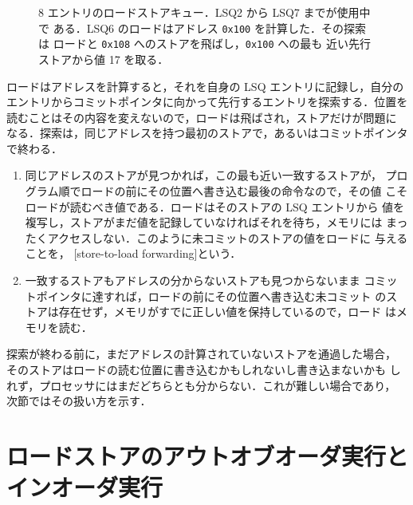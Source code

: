 \documentclass[../main.tex]{subfiles}
\begin{document}
\begin{figure}[htbp]
  \centering
  
  \caption{8 エントリのロードストアキュー．LSQ2 から LSQ7 までが使用中で
    ある．LSQ6 のロードはアドレス \texttt{0x100} を計算した．その探索は
    ロードと \texttt{0x108} へのストアを飛ばし，\texttt{0x100} への最も
    近い先行ストアから値 17 を取る．}
  \label{fig:l09-lsq}
\end{figure}

ロードはアドレスを計算すると，それを自身の LSQ エントリに記録し，自分の
エントリからコミットポインタに向かって先行するエントリを探索する．位置を
読むことはその内容を変えないので，ロードは飛ばされ，ストアだけが問題に
なる．探索は，同じアドレスを持つ最初のストアで，あるいはコミットポインタ
で終わる．
\begin{enumerate}
  \item 同じアドレスのストアが見つかれば，この最も近い一致するストアが，
    プログラム順でロードの前にその位置へ書き込む最後の命令なので，その値
    こそロードが読むべき値である．ロードはそのストアの LSQ エントリから
    値を複写し，ストアがまだ値を記録していなければそれを待ち，メモリには
    まったくアクセスしない．このように未コミットのストアの値をロードに
    与えることを，%
    [store-to-load forwarding]という．
  \item 一致するストアもアドレスの分からないストアも見つからないまま
    コミットポインタに達すれば，ロードの前にその位置へ書き込む未コミット
    のストアは存在せず，メモリがすでに正しい値を保持しているので，ロード
    はメモリを読む．
\end{enumerate}
探索が終わる前に，まだアドレスの計算されていないストアを通過した場合，
そのストアはロードの読む位置に書き込むかもしれないし書き込まないかも
しれず，プロセッサにはまだどちらとも分からない．これが難しい場合であり，
次節ではその扱い方を示す．

\section[ロードストアのアウトオブオーダ実行とインオーダ実行]%
  {ロードストアのアウトオブオーダ実行と\\インオーダ実行}
\label{sec:l09-policies}
\end{document}
